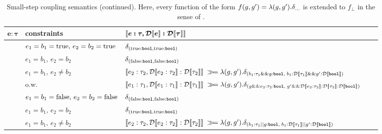 \begin{table}[t]
	\caption{Small-step coupling semantics (continued). Here, every function of the form $f(g,g') = \lambda (g,g').\dirac{\ldots}$ is extended to $f_{\bot}$ in the sense of .}
	\label{tab:coupling_smallstep_2}
	\begin{center}
		\begin{adjustbox}{width=\textwidth}
		\begin{tabular}{l l l l l}
			\toprule
			\toprule
			$\mathbf{e \boldsymbol{:} \boldsymbol{\tau}}$ & \textbf{constraints}  & $\boldsymbol{\llbracket e : \tau, \mathcal{D}\llbracket e \rrbracket : \mathcal{D}\llbracket \tau \rrbracket \rrbracket}$   \\
			\hline
			& $e_1 = b_1 = \textnormal{true},\, e_2 = b_2 = \textnormal{true}$ & $\delta_{(\textnormal{true} : \textnormal{\ttfamily\bfseries bool}, \textnormal{true} : \textnormal{\ttfamily\bfseries bool})}$ \\
			& $e_1 = b_1,\, e_2 = b_2$ & $\delta_{(\textnormal{false} : \textnormal{\ttfamily\bfseries bool}, \textnormal{false} : \textnormal{\ttfamily\bfseries bool})}$ \\
			& $e_1 = b_1,\, e_2 \neq b_2$ &
			 \\
			& o.w.\ &
			 \\
			\midrule
			& $e_1 = b_1 = \textnormal{false},\, e_2 = b_2 = \textnormal{false}$ & $\delta_{(\textnormal{false} : \textnormal{\ttfamily\bfseries bool}, \textnormal{false} : \textnormal{\ttfamily\bfseries bool})}$ \\
			& $e_1 = b_1,\, e_2 = b_2$ & $\delta_{(\textnormal{true} : \textnormal{\ttfamily\bfseries bool}, \textnormal{true} : \textnormal{\ttfamily\bfseries bool})}$ \\
			& $e_1 = b_1,\, e_2 \neq b_2$ &
			 \\

\end{tabular}
\end{adjustbox}
\end{center}
\end{table}
